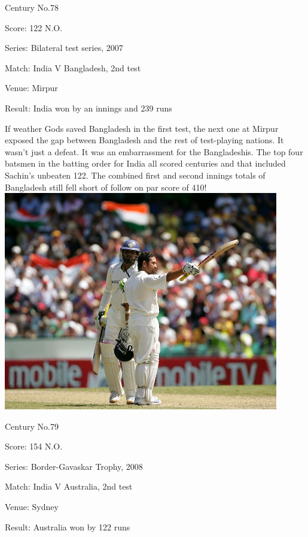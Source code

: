 \documentclass[11pt, a4paper]{article}
\begin{document}
Century No.78 

Score: 122 N.O. 

Series: Bilateral test series, 2007 

Match: India V Bangladesh, 2nd test 

Venue: Mirpur 

Result: India won by an innings and 239 runs 

If weather Gods saved Bangladesh in the first test, the next one at Mirpur exposed the gap between Bangladesh and the rest of test-playing nations. It wasn't just a defeat. It was an embarrassment for the Bangladeshis. The top four batsmen in the batting order for India all scored centuries and that included Sachin's unbeaten 122. The combined first and second innings totals of Bangladesh still fell short of follow on par score of 410!
\newpage
\includegraphics[width=0.9\textwidth]{pics/79.jpg}

Century No.79 

Score: 154 N.O. 

Series: Border-Gavaskar Trophy, 2008 

Match: India V Australia, 2nd test 

Venue: Sydney 

Result: Australia won by 122 runs 
\end{document}
